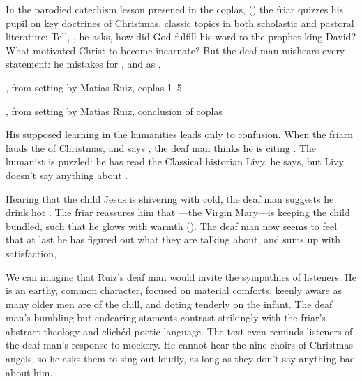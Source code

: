 In the parodied catechism lesson presened in the coplas, () the friar quizzes his pupil on key doctrines of Christmas, classic topics in both scholastic and pastoral literature:
Tell, , he asks, how did God fulfill his word to the prophet-king David?
What motivated Christ to become incarnate?
But the deaf man mishears every statement: he mistakes  for , and  as .

\begin{expoem}
  \caption{, from setting by Matías Ruiz, coplas 1--5}
  \label{expoem:Pues_la_fiesta-Ruiz-coplas-1}
\end{expoem}

\begin{expoem}
  \caption{, from setting by Matías Ruiz, conclusion of coplas}
  \label{expoem:Pues_la_fiesta-Ruiz-coplas-2}
\end{expoem}

His supposed learning in the humanities leads only to confusion.
When the friarn lauds the  of Christmas, and says , the deaf man thinks he is citing .
The humanist is puzzled: he has read the Classical historian Livy, he says, but Livy doesn't say anything about .

Hearing that the child Jesus is shivering with cold, the deaf man suggests he drink hot .
The friar reassures him that ---the Virgin Mary---is keeping the child bundled, such that he glows with warmth ().
The deaf man now seems to feel that at last he has figured out what they are talking about, and sums up with satisfaction, .

We can imagine that Ruiz's deaf man would invite the sympathies of listeners.
He is an earthy, common character, focused on material comforts, keenly aware as many older men are of the chill, and doting tenderly on the infant.
The deaf man's bumbling but endearing staments contrast strikingly with the friar's abstract theology and clichéd poetic language.
The text even reminds listeners of the deaf man's response to mockery.
He cannot hear the nine choirs of Christmas angels, so he asks them to sing out loudly, as long as they don't say anything bad about him.

